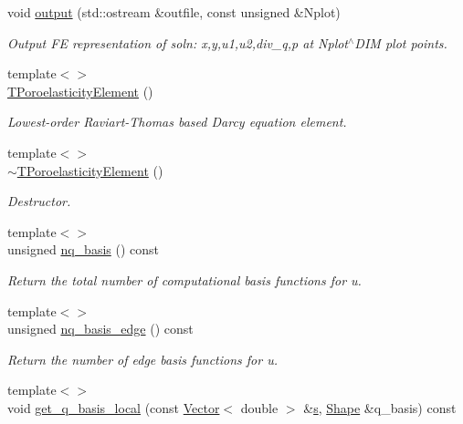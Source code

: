 \begin{DoxyCompactItemize}
void \hyperlink{classoomph_1_1TPoroelasticityElement_a9cf04cdc0ef6d649dd0dc1c8d954dc4b}{output} (std\+::ostream \&outfile, const unsigned \&Nplot)
\begin{DoxyCompactList}\small\item\em Output FE representation of soln\+: x,y,u1,u2,div\+\_\+q,p at Nplot$^\wedge$\+D\+IM plot points. \end{DoxyCompactList}\item 
{\footnotesize template$<$$>$ }\\\hyperlink{classoomph_1_1TPoroelasticityElement_ab78223e29eda05757af0745617b883f7}{T\+Poroelasticity\+Element} ()
\begin{DoxyCompactList}\small\item\em Lowest-\/order Raviart-\/\+Thomas based Darcy equation element. \end{DoxyCompactList}\item 
{\footnotesize template$<$$>$ }\\\hyperlink{classoomph_1_1TPoroelasticityElement_a71f8aa5d7346c2ac246e381e022737a0}{$\sim$\+T\+Poroelasticity\+Element} ()
\begin{DoxyCompactList}\small\item\em Destructor. \end{DoxyCompactList}\item 
{\footnotesize template$<$$>$ }\\unsigned \hyperlink{classoomph_1_1TPoroelasticityElement_aea11019e66b5f28fbdc3dfb4a538dac1}{nq\+\_\+basis} () const
\begin{DoxyCompactList}\small\item\em Return the total number of computational basis functions for u. \end{DoxyCompactList}\item 
{\footnotesize template$<$$>$ }\\unsigned \hyperlink{classoomph_1_1TPoroelasticityElement_ac757396ac2f88ed07d6b3b0e7a364fb7}{nq\+\_\+basis\+\_\+edge} () const
\begin{DoxyCompactList}\small\item\em Return the number of edge basis functions for u. \end{DoxyCompactList}\item 
{\footnotesize template$<$$>$ }\\void \hyperlink{classoomph_1_1TPoroelasticityElement_aeda8ff5b06e401e02516365f2e43003b}{get\+\_\+q\+\_\+basis\+\_\+local} (const \hyperlink{classoomph_1_1Vector}{Vector}$<$ double $>$ \&\hyperlink{cfortran_8h_ab7123126e4885ef647dd9c6e3807a21c}{s}, \hyperlink{classoomph_1_1Shape}{Shape} \&q\+\_\+basis) const

\end{DoxyCompactItemize}

